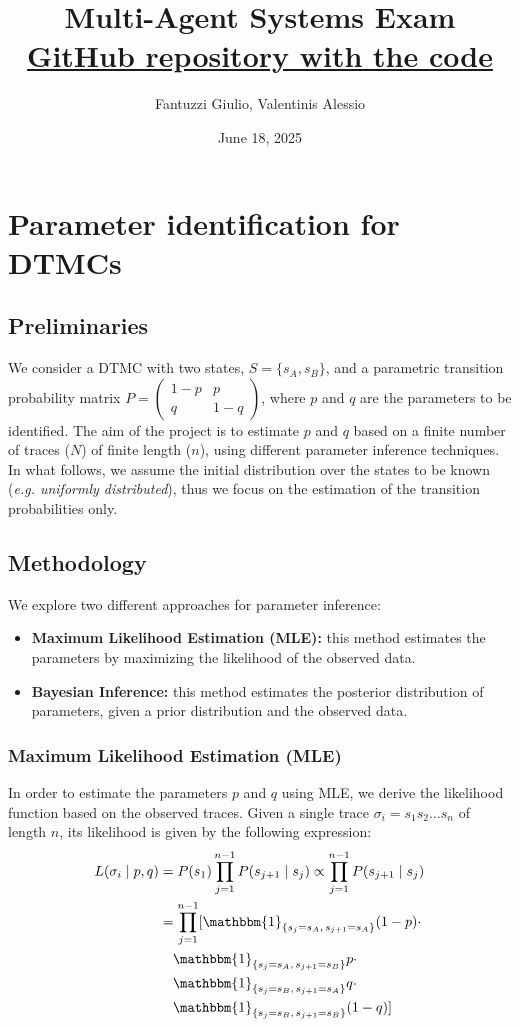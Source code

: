\documentclass[twocolumn, 9pt]{extarticle}
\title{Multi-Agent Systems Exam\\
\small \href{https://github.com/ValentinisAlessio/MultiAgentSystems_Exam}{GitHub repository with the code}} %
\author{Fantuzzi Giulio, Valentinis Alessio}
\date{June 18, 2025}
\begin{document}
\maketitle

\section{Parameter identification for DTMCs}

\subsection{Preliminaries}
We consider a DTMC with two states, $S = \{s_A, s_B\}$, and a parametric transition probability matrix $P = \begin{pmatrix} 1 - p & p \\ q & 1 - q \end{pmatrix}$, 
where $p$ and $q$ are the parameters to be identified.
The aim of the project is to estimate $p$ and $q$ based on a finite number of traces ($N$) of finite length ($n$), using different parameter inference techniques. In what
follows, we assume the initial distribution over the states to be known (\textit{e.g. uniformly distributed}), thus we focus on the estimation of the transition probabilities only.

\subsection{Methodology}
We explore two different approaches for parameter inference:
\begin{itemize}
    \item \textbf{Maximum Likelihood Estimation (MLE):} this method estimates the parameters by maximizing the likelihood of the observed data. 
    \item \textbf{Bayesian Inference:} this method estimates the posterior distribution of parameters, given a prior distribution and the observed data.
\end{itemize}
\subsubsection{Maximum Likelihood Estimation (MLE)}
In order to estimate the parameters $p$ and $q$ using MLE, we derive the likelihood function based on the observed traces.
Given a single trace $\sigma_i = s_1s_2\dots s_n$ of length $n$, its likelihood is given by the following expression:
\begin{align*}
L(\sigma_i \mid p, q) &= P(s_1) \prod_{j=1}^{n-1} P(s_{j+1} \mid s_j) \propto \prod_{j=1}^{n-1} P(s_{j+1} \mid s_j) \\
&= \prod_{j=1}^{n-1} [ \mathbbm{1}_{\{s_j = s_A,\, s_{j+1} = s_A\}} (1 - p) \cdot\\
&\quad  \mathbbm{1}_{\{s_j = s_A,\, s_{j+1} = s_B\}} p \cdot \\
&\quad  \mathbbm{1}_{\{s_j = s_B,\, s_{j+1} = s_A\}} q \cdot \\
&\quad  \mathbbm{1}_{\{s_j = s_B,\, s_{j+1} = s_B\}} (1 - q) ]
\end{align*}
\end{document}

